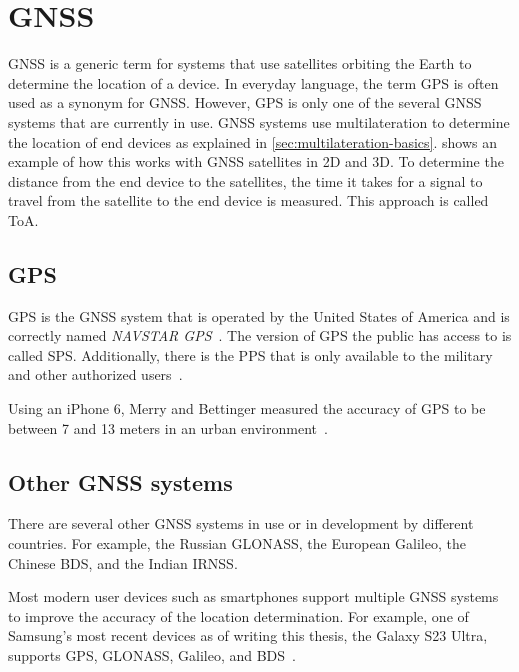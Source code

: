 \section{\acf{GNSS}}

\ac{GNSS} is a generic term for systems that use satellites orbiting the Earth to determine the location of a device.
In everyday language, the term \ac{GPS} is often used as a synonym for \ac{GNSS}.
However, \ac{GPS} is only one of the several \ac{GNSS} systems that are currently in use.
\ac{GNSS} systems use multilateration to determine the location of end devices as explained in \cref{sec:multilateration-basics}.
 shows an example of how this works with \ac{GNSS} satellites in 2D and 3D.
To determine the distance from the end device to the satellites, the time it takes for a signal to travel from the satellite to the end device is measured.
This approach is called \acf{ToA}.

\subsection{\acf{GPS}}

\ac{GPS} is the \ac{GNSS} system that is operated by the United States of America and is correctly named \emph{NAVSTAR \ac{GPS}}~\cite{department_of_defense_usa_gps_2020}.
The version of GPS the public has access to is called \acf{SPS}.
Additionally, there is the \acf{PPS} that is only available to the military and other authorized users~\cite{department_of_defense_usa_gps_2007}.

Using an iPhone 6, Merry and Bettinger measured the accuracy of \ac{GPS} to be between 7 and 13 meters in an urban environment~\cite{merry_smartphone_2019}.

\subsection{Other \acs{GNSS} systems}

There are several other \ac{GNSS} systems in use or in development by different countries.
For example, the Russian \acf{GLONASS}, the European \acf{Galileo}, the Chinese \acf{BDS}, and the Indian \acf{IRNSS}.

Most modern user devices such as smartphones support multiple \ac{GNSS} systems to improve the accuracy of the location determination.
For example, one of Samsung's most recent devices as of writing this thesis, the Galaxy S23 Ultra, supports \ac{GPS}, \ac{GLONASS}, \ac{Galileo}, and \ac{BDS}~\cite{gsmarena_samsung_2023}.

